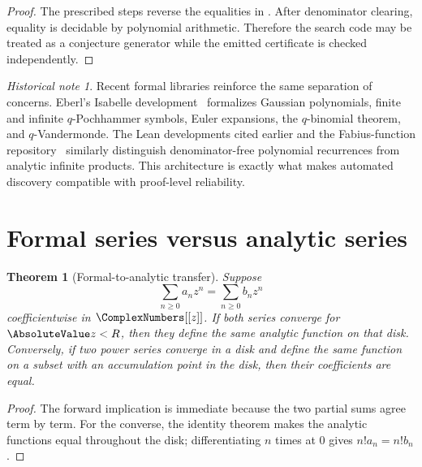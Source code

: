 \documentclass[11pt,a4paper,oneside,openany]{book}
\newtheorem{theorem}{Theorem}[chapter]
\theoremstyle{definition}
\theoremstyle{remark}
\newtheorem{historicalnote}[historicalnote]{Historical note}
\begin{document}
\begin{proof}
The prescribed steps reverse the equalities in
.  After denominator clearing, equality is decidable by polynomial arithmetic.  Therefore the search code may be treated as a conjecture generator while the emitted certificate is checked independently.
\end{proof}

\begin{historicalnote}
Recent formal libraries reinforce the same separation of concerns.  Eberl's Isabelle development~\cite{Eberl2024QAnalogues} formalizes Gaussian polynomials, finite and infinite $q$-Pochhammer symbols, Euler expansions, the $q$-binomial theorem, and $q$-Vandermonde.  The Lean developments cited earlier and the Fabius-function repository~\cite{ReshetnikovProveIt2026} similarly distinguish denominator-free polynomial recurrences from analytic infinite products.  This architecture is exactly what makes automated discovery compatible with proof-level reliability.
\end{historicalnote}

\section{Formal series versus analytic series}

\begin{theorem}[Formal-to-analytic transfer]\label{thm:formal-analytic-transfer}
Suppose
\[
 \sum_{n\ge0}a_nz^n=\sum_{n\ge0}b_nz^n
\]
coefficientwise in $\ComplexNumbers[[z]]$.  If both series converge for $\AbsoluteValue z<R$, then they define the same analytic function on that disk.  Conversely, if two power series converge in a disk and define the same function on a subset with an accumulation point in the disk, then their coefficients are equal.
\end{theorem}

\begin{proof}
The forward implication is immediate because the two partial sums agree term by term.  For the converse, the identity theorem makes the analytic functions equal throughout the disk; differentiating $n$ times at $0$ gives $n!a_n=n!b_n$.
\end{proof}
\end{document}
